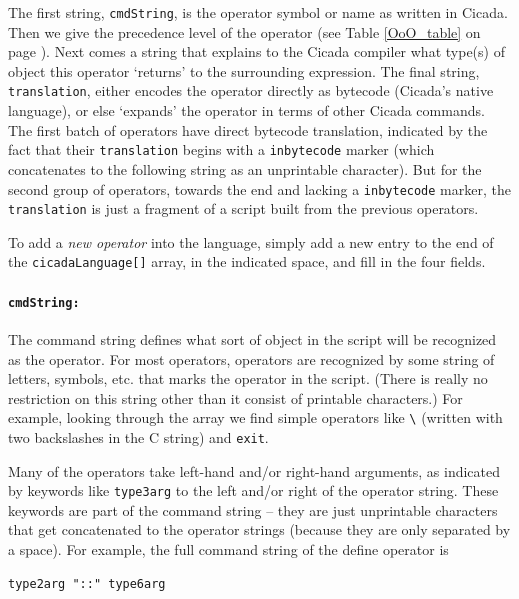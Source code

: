 \documentclass{article}
\newenvironment{code}{
       \begin{list}{}{
               \setlength{\leftmargin}{.4in}
               \setlength{\rightmargin}{0in}
               \setlength{\topsep}{.2in}
       }
       \small
       \item[] }
       { \end{list}   }
\begin{document}
\noindent The first string, \verb#cmdString#, is the operator symbol or name as written in Cicada.  Then we give the precedence level of the operator (see Table \ref{OoO_table} on page \pageref{OoO_table}).  Next comes a string that explains to the Cicada compiler what type(s) of object this operator `returns' to the surrounding expression.  The final string, \verb#translation#, either encodes the operator directly as bytecode (Cicada's native language), or else `expands' the operator in terms of other Cicada commands.  The first batch of operators have direct bytecode translation, indicated by the fact that their \verb#translation# begins with a \verb#inbytecode# marker (which concatenates to the following string as an unprintable character).  But for the second group of operators, towards the end and lacking a \verb#inbytecode# marker, the \verb#translation# is just a fragment of a script built from the previous operators.

To add a \emph{new operator} into the language, simply add a new entry to the end of the \verb#cicadaLanguage[]# array, in the indicated space, and fill in the four fields.



\paragraph{\texttt{cmdString:}}  The command string defines what sort of object in the script will be recognized as the operator.  For most operators, operators are recognized by some string of letters, symbols, etc. that marks the operator in the script.  (There is really no restriction on this string other than it consist of printable characters.)  For example, looking through the array we find simple operators like \verb#\# (written with two backslashes in the C string) and \verb#exit#.

Many of the operators take left-hand and/or right-hand arguments, as indicated by keywords like \verb#type3arg# to the left and/or right of the operator string.  These keywords are part of the command string -- they are just unprintable characters that get concatenated to the operator strings (because they are only separated by a space).  For example, the full command string of the define operator is

\begin{code} \begin{verbatim}
type2arg "::" type6arg
\end{verbatim} \end{code}
\end{document}
